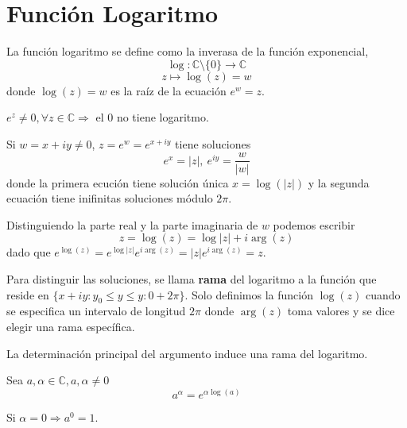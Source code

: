 \section{Función Logaritmo}

\begin{defn}[Logaritmo]
  La función logaritmo se define como la inverasa de la función exponencial, 
  \[
    \log: \mathbb{C} \setminus \{ 0 \} \to \mathbb{C}
  \]
  \[
    z \mapsto \log(z) = w
  \]
  donde $\log(z) = w$ es la raíz de la ecuación $e^{w} = z$.
\end{defn}

\begin{obs}
  $e^{z} \neq 0, \forall z \in \mathbb{C} \Rightarrow$ el $0$ no tiene logaritmo.
\end{obs}

\begin{obs}
  Si $w = x + iy \neq 0$, $z = e^{w} = e^{x + iy}$ tiene soluciones 
  \[ 
  e^{x} = |z|, \ e^{iy} = \frac{w}{|w|} 
  \]
  donde la primera ecución tiene solución única $x = \log(|z|)$ y la segunda ecuación tiene inifinitas soluciones módulo $2\pi$.  
\end{obs}

\begin{obs}
  Distinguiendo la parte real y la parte imaginaria de $w$ podemos escribir 
  \[ 
  z = \log(z) = \log |z| + i\arg(z)
  \]
  dado que $e^{\log(z)} = e^{\log |z|} e^{i \arg(z)} = |z|e^{i \arg(z)} = z$.
\end{obs}

\begin{obs}
  Para distinguir las soluciones, se llama \textbf{rama} del logaritmo a la función que reside en $\{ x + iy: y_{0} \leq y \leq y:0 + 2\pi \}$. Solo definimos la función $\log(z)$ cuando se especifica un intervalo de longitud $2\pi$ donde $\arg(z)$ toma valores y se dice elegir una rama específica.
\end{obs}

\begin{obs}
  La determinación principal del argumento induce una rama del logaritmo.
\end{obs}

\begin{defn}[Potencias]
  Sea $a,\alpha \in \mathbb{C}, a, \alpha \neq 0$
  \[ 
    a^{\alpha} = e^{\alpha \log(a)} 
  \] 
  
\end{defn}

\begin{obs}
  Si $\alpha = 0 \Rightarrow a^{0} = 1$.
\end{obs}

